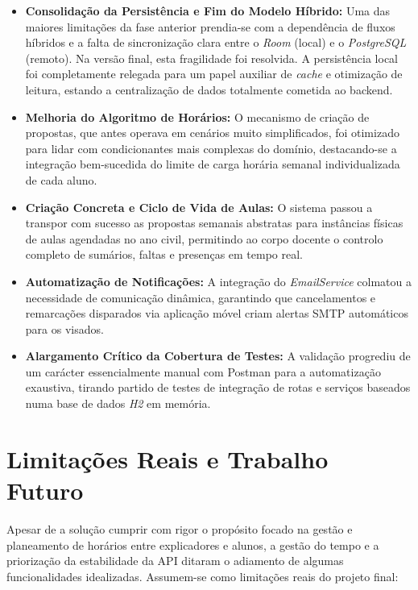\begin{itemize}
    \item \textbf{Consolida\c{c}\~ao da Persist\^encia e Fim do Modelo H\'ibrido:} Uma das maiores limita\c{c}\~oes da fase anterior prendia-se com a depend\^encia de fluxos h\'ibridos e a falta de sincroniza\c{c}\~ao clara entre o \textit{Room} (local) e o \textit{PostgreSQL} (remoto). Na vers\~ao final, esta fragilidade foi resolvida. A persist\^encia local foi completamente relegada para um papel auxiliar de \textit{cache} e otimiza\c{c}\~ao de leitura, estando a centraliza\c{c}\~ao de dados totalmente cometida ao backend.
    \item \textbf{Melhoria do Algoritmo de Horários:} O mecanismo de criação  de propostas, que antes operava em cenários muito simplificados, foi otimizado para lidar com condicionantes mais complexas do domínio, destacando-se a integração bem-sucedida do limite de carga horária semanal individualizada de cada aluno.
    \item \textbf{Criação Concreta e Ciclo de Vida de Aulas:} O sistema passou a transpor com sucesso as propostas semanais abstratas para instâncias físicas de aulas agendadas no ano civil, permitindo ao corpo docente o controlo completo de sumários, faltas e presenças em tempo real.
    \item \textbf{Automatização de Notificações:} A integração do \textit{EmailService} colmatou a necessidade de comunicação dinâmica, garantindo que cancelamentos e remarcações disparados via aplicação móvel criam alertas SMTP automáticos para os visados.
    \item \textbf{Alargamento Crítico da Cobertura de Testes:} A validação progrediu de um carácter essencialmente manual com Postman para a automatização exaustiva, tirando partido de testes de integração de rotas e serviços baseados numa base de dados \textit{H2} em memória.
\end{itemize}

\section{Limitações Reais e Trabalho Futuro}

Apesar de a solução cumprir com rigor o propósito focado na gestão e planeamento de horários entre explicadores e alunos, a gestão do tempo e a priorização da estabilidade da API ditaram o adiamento de algumas funcionalidades idealizadas. Assumem-se como limitações reais do projeto final:

